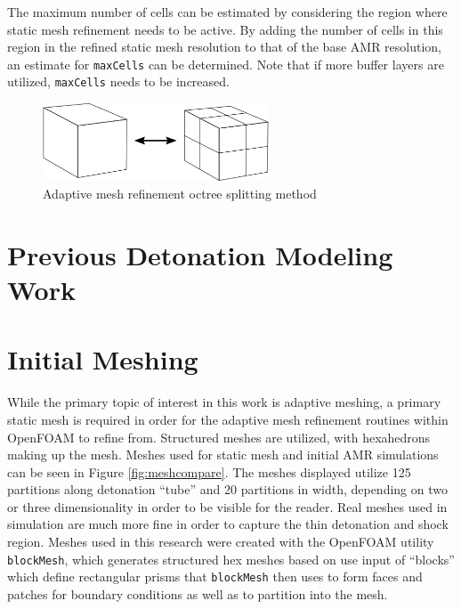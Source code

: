 The maximum number of cells can be estimated by considering the region where static mesh refinement needs to be active. By adding the number of cells in this region in the refined static mesh resolution to that of the base AMR resolution, an estimate for \verb|maxCells| can be determined. Note that if more buffer layers are utilized, \verb|maxCells| needs to be increased. 







\begin{figure}[]
\centering
\includegraphics[width=0.6\textwidth]{./figs/amr_example.png}
\caption{Adaptive mesh refinement octree splitting method}
\label{fig:octree}
\end{figure}

\section{Previous Detonation Modeling Work}

\section{Initial Meshing}
While the primary topic of interest in this work is adaptive meshing, a primary static mesh is required in order for the adaptive mesh refinement routines within OpenFOAM to refine from. Structured meshes are utilized, with hexahedrons making up the mesh. Meshes used for static mesh and initial AMR simulations can be seen in Figure \ref{fig:meshcompare}. The meshes displayed utilize 125 partitions along detonation ``tube'' and 20 partitions in width, depending on two or three dimensionality in order to be visible for the reader. Real meshes used in simulation are much more fine in order to capture the thin detonation and shock region. Meshes used in this research were created with the OpenFOAM utility \verb|blockMesh|, which generates structured hex meshes based on use input of ``blocks'' which define rectangular prisms that \verb|blockMesh| then uses to form faces and patches for boundary conditions as well as to partition into the mesh. 

